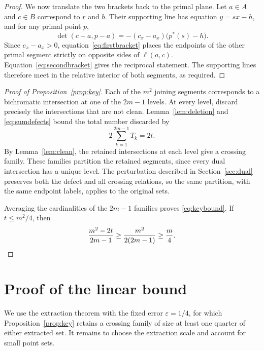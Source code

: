\documentclass[12pt]{article}
\begin{document}
\begin{proof}
We now translate the two brackets back to the primal plane.
Let \(a\in A\) and \(c\in B\) correspond to \(r\) and \(b\).
Their supporting line has equation \(y=sx-h\), and for any
primal point \(p\),
\[
 \det(c-a,p-a)
 =-(c_x-a_x)\bigl(p^*(s)-h\bigr).
\]
Since \(c_x-a_x>0\), equation~\eqref{eq:firstbracket} places the
endpoints of the other primal segment strictly on opposite sides
of \(\ell(a,c)\). Equation~\eqref{eq:secondbracket} gives the
reciprocal statement. The supporting lines therefore meet in the
relative interior of both segments, as required.
\end{proof}

\begin{proof}[Proof of Proposition~\ref{prop:key}]
Each of the \(m^2\) joining segments corresponds to a bichromatic
intersection at one of the \(2m-1\) levels. At every level, discard
precisely the intersections that are not clean.
Lemma~\ref{lem:deletion} and \eqref{eq:sumdefects} bound the total
number discarded by
\[
 2\sum_{k=1}^{2m-1}T_k=2t.
\]
By Lemma~\ref{lem:clean}, the retained intersections at each level
give a crossing family. These families partition the retained
segments, since every dual intersection has a unique level.
The perturbation described in Section~\ref{sec:dual} preserves
both the defect and all crossing relations, so the same partition,
with the same endpoint labels, applies to the original sets.

Averaging the cardinalities of the \(2m-1\) families proves
\eqref{eq:keybound}. If \(t\leq m^2/4\), then
\[
 \frac{m^2-2t}{2m-1}
 \geq \frac{m^2}{2(2m-1)}
 \geq \frac m4. \qedhere
\]
\end{proof}

\section{Proof of the linear bound}\label{sec:linear}

We use the extraction theorem with the fixed error
\(\varepsilon=1/4\), for which Proposition~\ref{prop:key} retains
a crossing family of size at least one quarter of either extracted
set. It remains to choose the extraction scale and account for
small point sets.
\end{document}
